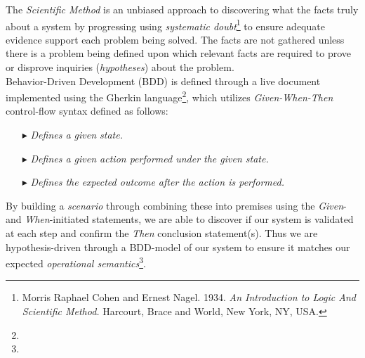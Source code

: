 The \emph{Scientific Method} is an unbiased approach to discovering what the facts truly about a system by progressing using \emph{systematic doubt}\footnote{Morris Raphael Cohen and Ernest Nagel. 1934. \emph{An Introduction to Logic And Scientific Method.} Harcourt, Brace and World, New York, NY, USA.} to ensure adequate evidence support each problem being solved.  The facts are not gathered unless there is a problem being defined upon which relevant facts are required to prove or disprove inquiries (\emph{hypotheses}) about the problem. \\




Behavior-Driven Development (BDD) is defined through a live document implemented using the Gherkin language\footnote{}, which utilizes \emph{Given-When-Then} control-flow syntax defined as follows: \\

\begin{itemize}
\item[\index{BDD (Given)}\code{Given }$\blacktriangleright$\hspace{-12mm}] \hspace{10mm}\emph{Defines a given state.}
\item[\index{BDD (When)}\code{When }$\blacktriangleright$\hspace{-12mm}] \hspace{10mm}\emph{Defines a given action performed under the given state.}
\item[\index{BDD (Then)}\code{Then }$\blacktriangleright$\hspace{-12mm}] \hspace{10mm}\emph{Defines the expected outcome after the action is performed.} \\
\end{itemize}

By building a \emph{scenario} through combining these into premises using the \emph{Given}- and \emph{When}-initiated statements, we are able to discover if our system is validated at each step and confirm the \emph{Then} conclusion statement(s).  Thus we are hypothesis-driven through a BDD-model of our system to ensure it matches our expected \emph{operational semantics}\footnote{}. \\


